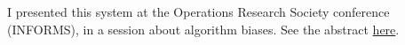 \documentclass[oneside,10pt]{book}
\begin{document}

\noindent I presented this system  at the Operations Research Society conference (INFORMS), in a session about algorithm biases. 
See the abstract \href{https://www.abstractsonline.com/pp8/#!/6818/presentation/6842}{here}. 




\printindex



\hypersetup{linkcolor=red} %
\hypersetup{linkcolor=red}
\end{document}
